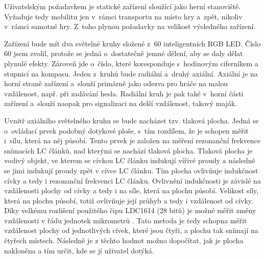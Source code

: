
Uživatelským požadavkem je statické zařízení sloužící jako herní stanoviště.
Vyžaduje tedy mobilitu jen v~rámci transportu na místo hry a~zpět, nikoliv v~rámci samotné hry.
Z~toho plynou požadavky na velikost výsledného zařízení.

Zařízení bude mít dva světelné kruhy složené z~60 inteligentních RGB LED.
Číslo 60 jsem zvolil, protože se jedná o~dostatečně jemné dělení, aby se daly dělat plynulé efekty.
Zároveň jde o~číslo, které koresponduje s~hodinovým ciferníkem a stupnicí na kompasu.
Jeden z~kruhů bude radiální a~druhý axiální.
Axiální je na horní straně zařízení a~slouží primárně jako odezva pro hráče na malou vzdálenost, např. při zadávání hesla.
Radiální kruh je pak také v~horní části zařízení a~slouží naopak pro signalizaci na delší vzdálenost, takový maják.

Uvnitř axiálního světelného kruhu se bude nacházet tzv. tlaková plocha.
\label{popisTlakovky} Jedná se o~ovládací prvek podobný dotykové ploše, s~tím rozdílem, že je schopen měřit i~sílu, která na něj působí.
Tento prvek je založen na měření rezonanční frekvence snímacích LC článků, nad kterými se nachází tlaková plocha.
Tlaková plocha je vodivý objekt, ve kterem se cívkou LC článku indukují vířivé proudy a následně se jimi indukují proudy zpět v cívce LC článku.
Tím plocha ovlivňuje indukčnost cívky a tedy i rezonanční frekvenci LC článku.
Ovlivnění indukčnosti je závislé na vzdálenosti plochy od cívky a tedy i na síle, která na plochu působí.
Velikost síly, která na plochu působí, totiž ovlivňuje její průhyb a tedy i vzdálenost od cívky.
Díky velkému rozlišení použitého čipu LDC1614 \cite{LDC1614} (28 bitů) je možné měřit změny vzdálenosti v řádu jednotek mikrometrů \cite{LDC1614LinearPositionSensing}.
Tato metoda je tedy schopna měřit vzdálenost plochy od jednotlivých cívek, které jsou čtyři, a plochu tak snímají na čtyřech místech.
Následně je z těchto hodnot možno dopočítat, jak je plocha nakloněna a tím určit, kde se jí uživatel dotýká.

